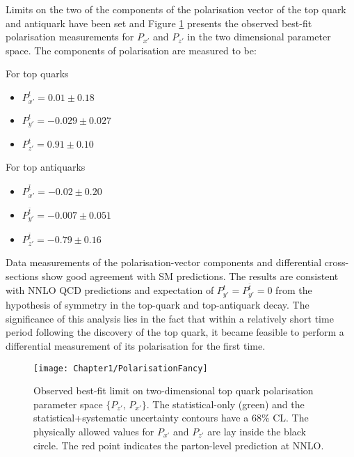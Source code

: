 Limits on the two of the components of the polarisation vector of the
top quark and antiquark have been set and Figure \ref{fig:Chap1:Polarisation:Result}
presents the observed best-fit polarisation measurements for $P_{x'}$ and $P_{z'}$ in the
two dimensional parameter space.
The components of polarisation are measured to be:

\begin{minipage}[t]{0.45\textwidth}
For top quarks
	\begin{itemize}
		\item $P_{x'}^{t} =  0.01 \pm 0.18$
		\item $P_{y'}^{t} = -0.029 \pm 0.027$
		\item $P_{z'}^{t} =   0.91 \pm 0.10$
	\end{itemize}
\end{minipage}
\begin{minipage}[t]{0.45\textwidth} 
For top antiquarks
	\begin{itemize}
		\item $P_{x'}^{\bar{t}} =  -0.02 \pm 0.20$
		\item $P_{y'}^{\bar{t}} = -0.007 \pm 0.051$
		\item $P_{z'}^{\bar{t}} =   -0.79 \pm 0.16$
	\end{itemize}
\end{minipage}

Data measurements of the polarisation-vector components and 
differential cross-sections show good agreement with SM predictions.
 The results are consistent with NNLO QCD predictions and expectation of
$P_{y'}^{t} = P_{y'}^{\bar{t}} = 0$ from the hypothesis of \CP symmetry 
in the top-quark and top-antiquark decay. 
The significance of this analysis lies in the fact that within a relatively short 
time period following the discovery of the top quark, it became feasible to 
perform a differential measurement of its polarisation for the first time.

\begin{figure}[h]
    \centering
    \texttt{[image: Chapter1/PolarisationFancy]}
    \caption{Observed best-fit limit on two-dimensional top quark polarisation
    parameter space $\{P_{z'},\, P_{x'}\}$. The statistical-only (green)
    and the statistical+systematic uncertainty contours have a 68\% CL.
    The physically allowed values for $P_{x'}$ and $P_{z'}$ are lay inside the black circle. 
    The red point indicates the parton-level prediction at NNLO.}
    \label{fig:Chap1:Polarisation:Result}
\end{figure}


